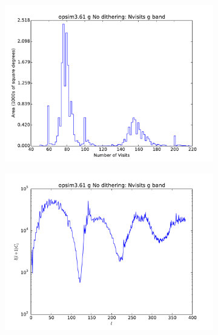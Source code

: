 \documentclass[]{spie}  %
\begin{document}
\begin{figure}
\begin{center}
\begin{subfigure}[]{0.2\textwidth}
\includegraphics[width=\textwidth]{figures/opsim3_61_Nvisits_g_band_g_No_dithering_HEAL_Histogram}
\caption{}
\label{subfig:gbandc}
\end{subfigure}
\begin{subfigure}[]{0.2\textwidth}
\includegraphics[width=\textwidth]{figures/opsim3_61_Nvisits_g_band_g_No_dithering_HEAL_PowerSpectrum}
\caption{}
\label{subfig:gbandd}
\end{subfigure}
~~
\begin{subfigure}[]{0.2\textwidth}

\end{subfigure}
\end{center}
\end{figure}
\end{document}
